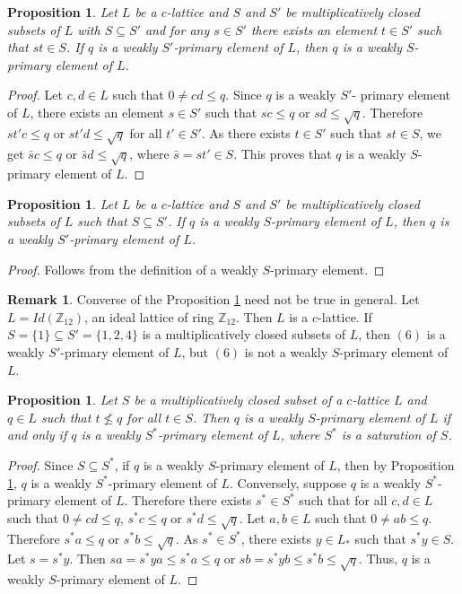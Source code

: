 \documentclass[10pt,twoside,a4paper]{amsart}
\numberwithin{equation}{section}
\theoremstyle{plain}
\newtheorem{prop}[lem]{Proposition}
\theoremstyle{definition}
\newtheorem{rem}[lem]{Remark}
\begin{document}
\begin{prop}
	Let $L$ be a $c$-lattice and $S$ and $S'$  be multiplicatively closed subsets of $L$ with  $S \subseteq S'$ and for any $s \in S'$ there exists an element $t \in S'$ such that $st \in S$.  If $q$ is a weakly $S'$-primary element of $L$, then $q$ is a weakly $S$-primary element of $L$.
\end{prop}

\begin{proof} Let $c,d \in L$ such that $0 \neq cd \leq q$. Since $q$ is a weakly $S'$- primary element of $L$, there exists an element $s \in S'$ such that $sc \leq q$ or $sd \leq \sqrt{q}$. Therefore $st'c \leq q$ or $st'd \leq \sqrt{q}$  for all $t' \in S'$. As there exists $t \in S'$ such that $ st \in S$, we get $\bar{s}c \leq q$ or $\bar{s}d \leq \sqrt{q}$, where $\bar{s} =s t' \in S$. This proves that $q$ is a weakly $S$-primary element of $L$.  
\end{proof}



\begin{prop}\label{imply}
	Let $L$ be a $c$-lattice and $S$ and $S'$  be multiplicatively closed subsets of $L$ such that $S \subseteq S'$.  If $q$ is a weakly $S$-primary element of $L$, then $q$ is a weakly $S'$-primary element of $L$.
\end{prop}

\begin{proof}
	Follows from the definition of a weakly $S$-primary element.
\end{proof}

\begin{rem}
	Converse of the Proposition \ref{imply} need not be true in general. Let $L=Id(\mathbb{Z}_{12})$, an ideal lattice of ring $\mathbb{Z}_{12}$. Then $L$ is a $c$-lattice. If $S =\{1\} \subseteq S' =\{1,2,4\}$ is a multiplicatively closed subsets of $L$, then $(6)$ is a weakly $S'$-primary element of $L$, but $(6)$ is  not a weakly $S$-primary element of $L$. 
\end{rem}




\begin{prop}
	Let $S$ be a multiplicatively closed subset of a $c$-lattice $L$ and $q \in L$ such that $t\nleq q$ for all $t\in S$. Then $q$ is a weakly $S$-primary element of $L$ if and only if $q$ is a weakly $S^*$-primary element of $L$, where $S^*$ is a saturation of $S$.
\end{prop}	
\begin{proof}
	Since $S\subseteq S^*$, if $q$ is a weakly $S$-primary element of $L$, then by Proposition \ref{imply}, $q$ is a weakly $S^*$-primary element of $L$.
	Conversely, suppose $q$ is a weakly $S^*$-primary element of $L$. Therefore there exists $s^*\in S^*$ such that for all $c,d\in L$ such that $ 0 \neq cd\leq q$, $s^*c\leq q$ or $s^*d\leq \sqrt{q}$. Let $a,b\in L$ such that $0 \neq ab \leq q$. Therefore $s^*a\leq q$ or $s^*b\leq \sqrt{q}$. As $s^*\in S^*$, there exists $y\in L_*$ such that $s^*y\in S$. Let $s=s^*y$. Then $sa=s^*ya\leq s^*a\leq q$ or $sb=s^*yb\leq s^*b\leq \sqrt{q}$. Thus, $q$ is a weakly $S$-primary element of $L$.
\end{proof}
\end{document}
